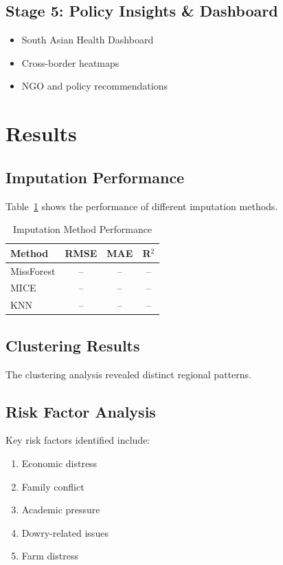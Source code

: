 \documentclass[12pt,a4paper]{article}
\begin{document}
\subsection{Stage 5: Policy Insights \& Dashboard}
\begin{itemize}
    \item South Asian Health Dashboard
    \item Cross-border heatmaps
    \item NGO and policy recommendations
\end{itemize}

\section{Results}

\subsection{Imputation Performance}
Table~\ref{tab:imputation} shows the performance of different imputation methods.

\begin{table}[H]
\centering
\caption{Imputation Method Performance}
\label{tab:imputation}
\begin{tabular}{@{}lccc@{}}
\toprule
\textbf{Method} & \textbf{RMSE} & \textbf{MAE} & \textbf{R$^2$} \\
\midrule
MissForest & -- & -- & -- \\
MICE & -- & -- & -- \\
KNN & -- & -- & -- \\
\bottomrule
\end{tabular}
\end{table}

\subsection{Clustering Results}
The clustering analysis revealed distinct regional patterns.

\subsection{Risk Factor Analysis}
Key risk factors identified include:
\begin{enumerate}
    \item Economic distress
    \item Family conflict
    \item Academic pressure
    \item Dowry-related issues
    \item Farm distress
\end{enumerate}
\end{document}
